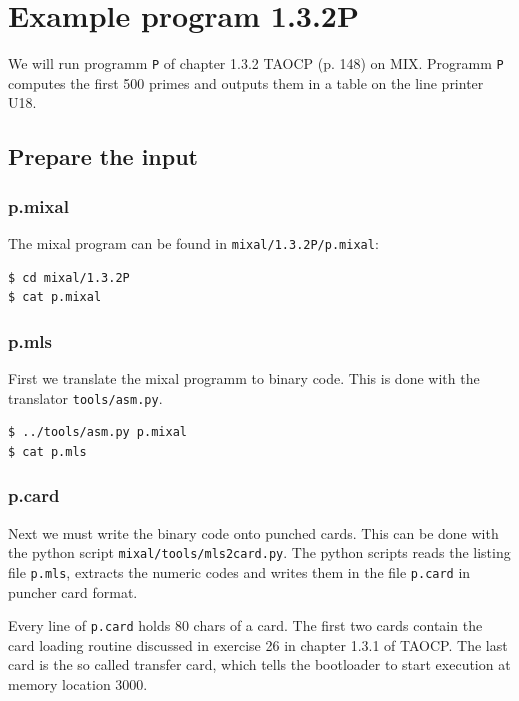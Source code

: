 \documentclass[a4paper,ngerman]{scrartcl}
\begin{document}
\section{Example program 1.3.2P}

We will run programm \lstinline|P| of chapter 1.3.2 TAOCP (p. 148) on MIX. Programm \lstinline|P| computes the first 500 primes and outputs them in a table on the line printer U18.

\subsection{Prepare the input}
\subsubsection{p.mixal}
The mixal program can be found in \lstinline|mixal/1.3.2P/p.mixal|:

\begin{lstlisting}[numbers=none,frame=none]
$ cd mixal/1.3.2P
$ cat p.mixal
\end{lstlisting}



\subsubsection{p.mls}
First we translate the mixal programm to binary code. This is done with the translator \lstinline|tools/asm.py|.

\begin{lstlisting}[numbers=none,frame=none]
$ ../tools/asm.py p.mixal
$ cat p.mls
\end{lstlisting}



\subsubsection{p.card}
Next we must write the binary code onto punched cards. This can be done with the python script \lstinline|mixal/tools/mls2card.py|.
The python scripts reads the listing file \lstinline|p.mls|, extracts the numeric codes and writes them in the file \lstinline|p.card| in puncher card format.

Every line of \lstinline|p.card| holds 80 chars of a card. The first two cards contain the card loading routine discussed in exercise 26 in chapter 1.3.1 of TAOCP. The last card is the so called transfer card, which tells the bootloader to start execution at memory location 3000.
\end{document}
